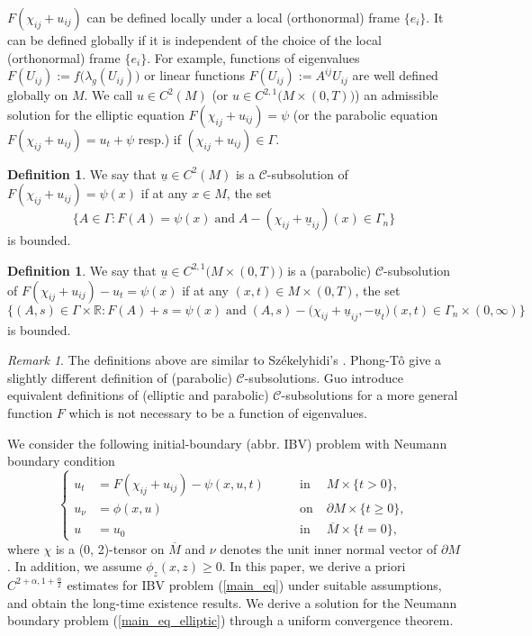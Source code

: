 \documentclass[12pt]{amsart}
\theoremstyle{definition}
\newtheorem{definition}[theorem]{Definition}
\theoremstyle{remark}
\newtheorem{remark}[theorem]{Remark}
\numberwithin{equation}{section}
\begin{document}
$F(\chi_{ij} + u_{ij})$ can be defined locally under a local (orthonormal) frame $\{e_i\}$.
It can be defined globally if it is independent of the choice of the local (orthonormal) frame $\{e_i\}$. For example, functions of eigenvalues $F(U_{ij}) := f\big(\lambda_g(U_{ij})\big)$ or linear functions $F(U_{ij}) := A^{ij}U_{ij}$ are well defined globally on $M$.
We call $u \in C^2 (M)$ (or $u \in C^{2, 1} \big(M \times (0, T)\big)$) an admissible solution for the elliptic equation $F(\chi_{ij} + u_{ij}) = \psi$ (or the parabolic equation $F(\chi_{ij} + u_{ij}) = u_t + \psi$ resp.) if $(\chi_{ij} + u_{ij}) \in \Gamma$.


\begin{definition}\label{Def_C-sub}
	We say that $\underline{u} \in C^2(M)$ is a $\mathcal{C}$-subsolution of $F(\chi_{ij} + u_{ij}) = \psi(x)$ if at any $x \in M$, the set
	$$\Big\{ A \in \Gamma : F(A) = \psi(x) \; \text{and}\; A - (\chi_{ij} + \underline{u}_{ij})(x) \in \Gamma_n \Big\}$$
	is bounded.
\end{definition}

\begin{definition}\label{Def_C-sub_parabolic}
	We say that $\underline{u} \in C^{2,1}\big(M\times(0, T)\big)$ is a (parabolic) $\mathcal{C}$-subsolution of $F(\chi_{ij} + u_{ij}) - u_t = \psi(x)$ if at any $(x, t) \in M\times(0,T)$, the set
	$$\Big\{ (A, s) \in \Gamma \times \mathbb{R} : F(A) + s = \psi(x) \; \text{and}\; (A, s) - \big(\chi_{ij} + \underline{u}_{ij}, - \underline{u}_t\big)(x, t) \in \Gamma_n\times(0, \infty) \Big\}$$
	is bounded.
\end{definition}


\begin{remark}
	The definitions above are similar to Sz\'ekelyhidi's \cite{Sze15}. Phong-T\^o \cite{PhongTo17} give a slightly different definition of (parabolic) $\mathcal{C}$-subsolutions. Guo \cite{GuoThesis19} introduce equivalent definitions of (elliptic and parabolic) $\mathcal{C}$-subsolutions for a more general function $F$ which is not necessary to be a function of eigenvalues.
\end{remark}

We consider the following initial-boundary (abbr. IBV) problem with Neumann boundary condition
\begin{equation} \label{main_eq}
\left\{
\begin{aligned}
u_t &= F(\chi_{ij} + u_{ij}) - \psi(x, u, t) \qquad &\text{in}&\; M \times \{t>0\}, \\ 
u_\nu &= \phi(x, u) \qquad &\text{on}& \; \partial M \times \{t \geq 0\},\\
u  &= u_0 \qquad & \text{in}& \; \overline{M}\times\{t = 0\},
\end{aligned}
\right.
\end{equation}
where $\chi$ is a (0, 2)-tensor on $\overline{M}$ and $\nu$ denotes the unit inner normal vector of $\partial M$. In addition, we assume $\phi_z (x,z) \geq 0$.
In this paper, we derive a priori $C^{2+\alpha, 1+\frac{\alpha}{2}}$ estimates for IBV problem (\ref{main_eq}) under suitable assumptions, and obtain the long-time existence results. We derive a solution for the Neumann boundary problem (\ref{main_eq_elliptic}) through a uniform convergence theorem.
\end{document}
